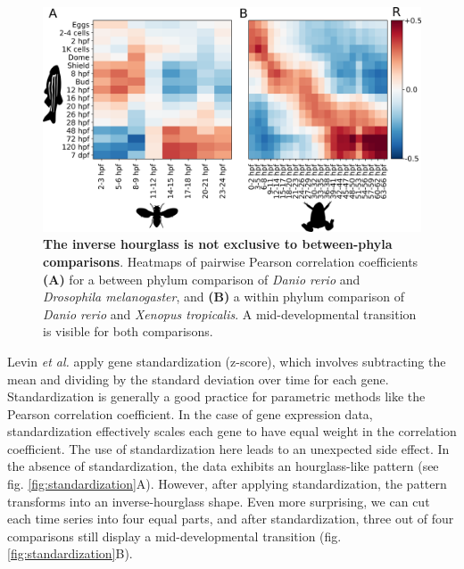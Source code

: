 \begin{figure}[H]
    \includegraphics[width=\linewidth]{ch.hourglass/images/within_between_phyla.png}
    \caption{\textbf{The inverse hourglass is not exclusive to between-phyla comparisons}. Heatmaps of pairwise Pearson correlation coefficients \textbf{(A)} for a between phylum comparison of \textit{Danio rerio} and \textit{Drosophila melanogaster}, and \textbf{(B)} a within phylum comparison of \textit{Danio rerio} and \textit{Xenopus tropicalis}. A mid-developmental transition is visible for both comparisons.}
    \label{fig:within_phylum}
\end{figure}

Levin \textit{et al.} apply gene standardization (z-score), which involves subtracting the mean and dividing by the standard deviation over time for each gene. Standardization is generally a good practice for parametric methods like the Pearson correlation coefficient. In the case of gene expression data, standardization effectively scales each gene to have equal weight in the correlation coefficient. The use of standardization here leads to an unexpected side effect. In the absence of standardization, the data exhibits an hourglass-like pattern (see fig. \ref{fig:standardization}A). However, after applying standardization, the pattern transforms into an inverse-hourglass shape. Even more surprising, we can cut each time series into four equal parts, and after standardization, three out of four comparisons still display a mid-developmental transition (fig. \ref{fig:standardization}B). 

